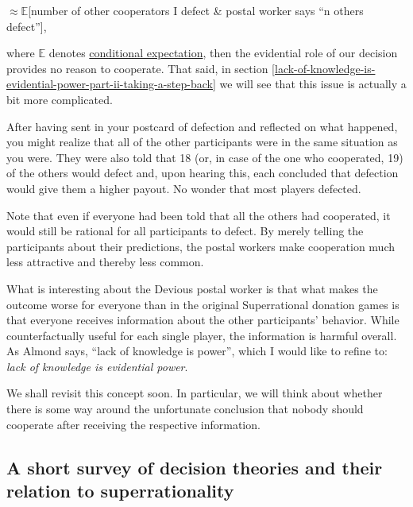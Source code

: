 $\approx \mathbb{E}${[}number of other cooperators \textbar{} I defect \& postal worker
says ``n others defect''{]},

where $\mathbb{E}$ denotes
\href{https://en.wikipedia.org/wiki/Conditional_expectation}{conditional
expectation}, then the evidential role of our decision provides no
reason to cooperate. That said, in section
\ref{lack-of-knowledge-is-evidential-power-part-ii-taking-a-step-back} we
will see that this issue is actually a bit more complicated.

After having sent in your postcard of defection and reflected on what
happened, you might realize that all of the other participants were in
the same situation as you were. They were also told that 18 (or, in case
of the one who cooperated, 19) of the others would defect and, upon
hearing this, each concluded that defection would give them a higher
payout. No wonder that most players defected.

Note that even if everyone had been told that all the others had
cooperated, it would still be rational for all participants to defect.
By merely telling the participants about their predictions, the postal
workers make cooperation much less attractive and thereby less common.

What is interesting about the Devious postal worker is that what makes
the outcome worse for everyone than in the original Superrational
donation games is that everyone receives information about the other
participants' behavior. While counterfactually useful for each single
player, the information is harmful overall. As Almond 
\citeyear{Almond2010-xn} says, ``lack of knowledge is
power'', which I would like to refine to: \emph{lack of knowledge is
evidential power}.

We shall revisit this concept soon. In particular, we will think about
whether there is some way around the unfortunate conclusion that nobody
should cooperate after receiving the respective information.

\hypertarget{a-short-survey-of-decision-theories-and-their-relation-to-superrationality}{\subsection{A
short survey of decision theories and their relation to
superrationality}\label{a-short-survey-of-decision-theories-and-their-relation-to-superrationality}}

